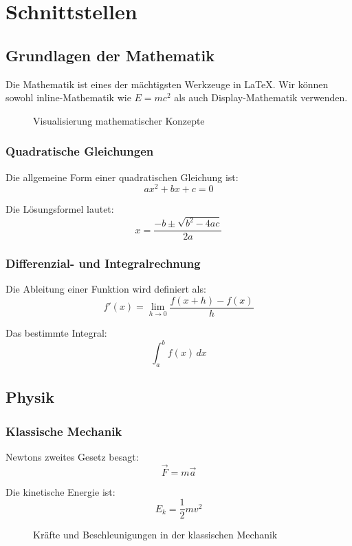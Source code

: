 \chapter{Schnittstellen}
\section{Grundlagen der Mathematik}

Die Mathematik ist eines der mächtigsten Werkzeuge in \LaTeX{}. Wir können sowohl inline-Mathematik wie $E = mc^2$ als auch Display-Mathematik verwenden.

\begin{figure}[h]
\centering
{}
\caption{Visualisierung mathematischer Konzepte}
\label{fig:math_visualization}
\end{figure}

\subsection{Quadratische Gleichungen}

Die allgemeine Form einer quadratischen Gleichung ist:
\[
ax^2 + bx + c = 0
\]

Die Lösungsformel lautet:
\[
x = \frac{-b \pm \sqrt{b^2 - 4ac}}{2a}
\]

\subsection{Differenzial- und Integralrechnung}

Die Ableitung einer Funktion wird definiert als:
\[
f'(x) = \lim_{h \to 0} \frac{f(x+h) - f(x)}{h}
\]

Das bestimmte Integral:
\[
\int_a^b f(x) \, dx
\]

\section{Physik}

\subsection{Klassische Mechanik}

Newtons zweites Gesetz besagt:
\[
\vec{F} = m \vec{a}
\]

Die kinetische Energie ist:
\[
E_k = \frac{1}{2}mv^2
\]

\begin{figure}[h]
\centering
{}
\caption{Kräfte und Beschleunigungen in der klassischen Mechanik}
\label{fig:classical_mechanics}
\end{figure}
